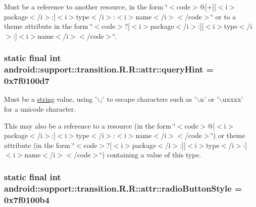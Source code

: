 Must be a reference to another resource, in the form \char`\"{}$<$code$>$@\mbox{[}+\mbox{]}\mbox{[}$<$i$>$package$<$/i$>$:\mbox{]}$<$i$>$type$<$/i$>$:$<$i$>$name$<$/i$>$$<$/code$>$\char`\"{} or to a theme attribute in the form \char`\"{}$<$code$>$?\mbox{[}$<$i$>$package$<$/i$>$:\mbox{]}\mbox{[}$<$i$>$type$<$/i$>$:\mbox{]}$<$i$>$name$<$/i$>$$<$/code$>$\char`\"{}. \hypertarget{classandroid_1_1support_1_1transition_1_1_r_1_1attr_6bd0488644338cc8ed6e8661766f53a4}{
\subsubsection[{queryHint}]{\setlength{\rightskip}{0pt plus 5cm}static final int android::support::transition.R.R::attr::queryHint = 0x7f0100d7}}
\label{classandroid_1_1support_1_1transition_1_1_r_1_1attr_6bd0488644338cc8ed6e8661766f53a4}


Must be a \hyperlink{classandroid_1_1support_1_1transition_1_1_r_1_1string}{string} value, using '$\backslash$;' to escape characters such as '$\backslash$n' or '$\backslash$uxxxx' for a unicode character. 

This may also be a reference to a resource (in the form \char`\"{}$<$code$>$@\mbox{[}$<$i$>$package$<$/i$>$:\mbox{]}$<$i$>$type$<$/i$>$:$<$i$>$name$<$/i$>$$<$/code$>$\char`\"{}) or theme attribute (in the form \char`\"{}$<$code$>$?\mbox{[}$<$i$>$package$<$/i$>$:\mbox{]}\mbox{[}$<$i$>$type$<$/i$>$:\mbox{]}$<$i$>$name$<$/i$>$$<$/code$>$\char`\"{}) containing a value of this type. \hypertarget{classandroid_1_1support_1_1transition_1_1_r_1_1attr_42c5aba4122d8f953b6e723987cc7eac}{
\subsubsection[{radioButtonStyle}]{\setlength{\rightskip}{0pt plus 5cm}static final int android::support::transition.R.R::attr::radioButtonStyle = 0x7f0100b4}}
\label{classandroid_1_1support_1_1transition_1_1_r_1_1attr_42c5aba4122d8f953b6e723987cc7eac}


